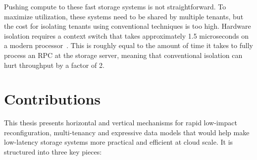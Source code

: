 Pushing compute to these fast storage systems is
not straightforward.
%
To maximize utilization, these
systems need to be shared by multiple tenants,
but the cost for isolating tenants using conventional techniques is too
high.
%
Hardware isolation
requires a context switch that takes approximately
1.5 microseconds on a modern processor~\cite{splinter}.
%
This
is roughly equal to the amount of time it takes to
fully process an RPC at the storage server, meaning
that conventional isolation can hurt throughput by
a factor of 2.

%

\section{Contributions}


\vspace{8pt}

This thesis presents horizontal and vertical mechanisms for
rapid low-impact reconfiguration, multi-tenancy and expressive data
models that
would help make low-latency storage systems more practical and
efficient at cloud scale.
%
It is structured into three key pieces:

